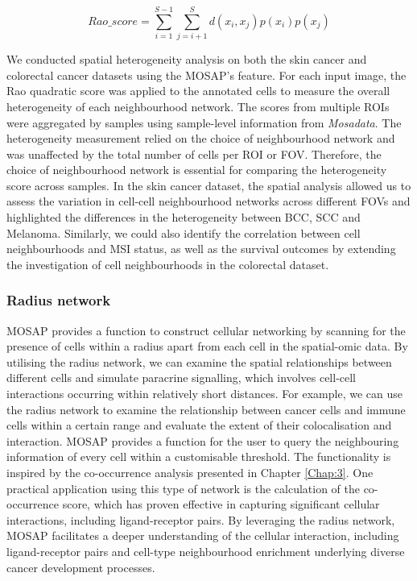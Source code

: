 \begin{equation}
    Rao\_score = \sum^{S-1}_{i=1}\sum^{S}_{j=i+1}d(x_i, x_j)p(x_i)p(x_j)
\label{chap4:eq:02}
\end{equation}

We conducted spatial heterogeneity analysis on both the skin cancer and colorectal cancer datasets using the MOSAP's feature. For each input image, the Rao quadratic score was applied to the annotated cells to measure the overall heterogeneity of each neighbourhood network. The scores from multiple ROIs were aggregated by samples using sample-level information from \textit{Mosadata}. The heterogeneity measurement relied on the choice of neighbourhood network and was unaffected by the total number of cells per ROI or FOV. Therefore, the choice of neighbourhood network is essential for comparing the heterogeneity score across samples. In the skin cancer dataset, the spatial analysis allowed us to assess the variation in cell-cell neighbourhood networks across different FOVs and highlighted the differences in the heterogeneity between BCC, SCC and Melanoma. Similarly, we could also identify the correlation between cell neighbourhoods and MSI status, as well as the survival outcomes  by extending the investigation of cell neighbourhoods in the colorectal dataset.          

\subsubsection{Radius network}
MOSAP provides a function to construct cellular networking by scanning for the presence of cells within a radius apart from each cell in the spatial-omic data. By utilising the radius network, we can examine the spatial relationships between different cells and simulate paracrine signalling, which involves cell-cell interactions occurring within relatively short distances. For example, we can use the radius network to examine the relationship between cancer cells and immune cells within a certain range and evaluate the extent of their colocalisation and interaction. MOSAP provides a function for the user to query the neighbouring information of every cell within a customisable threshold. The functionality is inspired by the co-occurrence analysis presented in Chapter \ref{Chap:3}. One practical application using this type of network is the calculation of the co-occurrence score, which has proven effective in capturing significant cellular interactions, including ligand-receptor pairs. By leveraging the radius network, MOSAP facilitates a deeper understanding of the cellular interaction, including ligand-receptor pairs and cell-type neighbourhood enrichment underlying diverse cancer development processes.        

